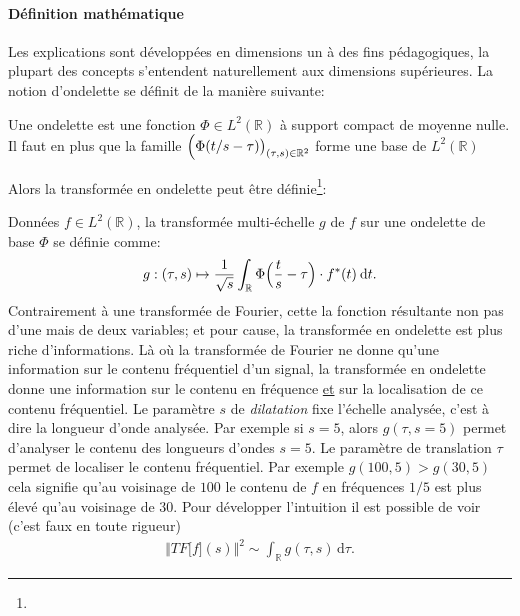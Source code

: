     \paragraph{Définition mathématique}
        Les explications sont développées en dimensions un à des fins pédagogiques, la plupart des concepts s'entendent naturellement aux dimensions supérieures. 
        La notion d'ondelette se définit de la manière suivante:
        \begin{definition}
            Une ondelette est une fonction $\Phi \in L^2(\mathbb R)$ à support compact de moyenne nulle.
            Il faut en plus que la famille $\Bigl( \Phi(t/s - \tau ) \bigr)_{ (\tau,s)\in \mathbb{R}^2 }$ forme une base de $L^2(\mathbb{R})$
        \end{definition}
        Alors la transformée en ondelette peut être définie\footnote{}:
        \begin{definition}
            Données $f \in L^2(\mathbb R)$, la transformée multi-échelle $g$ de $f$ sur une ondelette de base $\Phi$ se définie comme:
            \begin{align}
                g: (\tau,s) \mapsto \frac{1}{\sqrt{s}}\int_{\mathbb R} \Phi\Bigl(\frac{t}{s}  - \tau\Bigr) \cdot f^*(t)\: \text{d}t.
            \end{align}
            Contrairement à une transformée de Fourier, cette la fonction résultante non pas d'une mais de deux variables; et pour cause, 
            la transformée en ondelette est plus riche d'informations. Là où la transformée de Fourier ne donne qu'une information 
            sur le contenu fréquentiel d'un signal, la transformée en ondelette donne une information sur le contenu en fréquence \underline{et}
            sur la localisation de ce contenu fréquentiel.
            Le paramètre $s$ de \textit{dilatation} fixe l'échelle analysée, c'est à dire la longueur d'onde analysée. Par exemple si $s=5$, 
            alors $g(\tau,s=5)$ permet d'analyser le contenu des longueurs d'ondes $s=5$. Le paramètre de translation $\tau$ permet de localiser 
            le contenu fréquentiel. Par exemple $g(100,5)> g(30,5)$ cela signifie qu'au voisinage de $100$ le contenu de $f$ en fréquences $1/5$
            est plus élevé qu'au voisinage de $30$. Pour développer l'intuition il est possible de voir (c'est faux en toute rigueur)
            \begin{align}
                \Vert TF\bigl[ f \bigr](s) \Vert^2 \sim \int_\mathbb{R} g(\tau,s) \, \text{d} \tau.
            \end{align}
        \end{definition}
